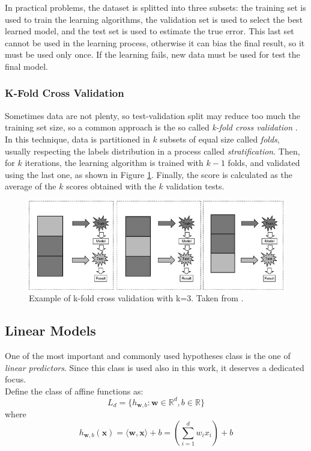 In practical problems, the dataset is splitted into three subsets: the training set is used to train the learning algorithms, the validation set is used to select the best learned model, and the test set is used to estimate the true error. This last set cannot be used in the learning process, otherwise it can bias the final result, so it must be used only once. If the learning fails, new data must be used for test the final model.


\subsubsection{K-Fold Cross Validation}
Sometimes data are not plenty, so test-validation split may reduce too much the training set size, so a common approach is the so called \textit{k-fold cross validation} \cite{Refaeilzadeh2009}. In this technique, data is partitioned in $k$ subsets of equal size called \textit{folds}, usually respecting the labels distribution in a process called \textit{stratification}. Then, for $k$ iterations, the learning algorithm is trained with $k-1$ folds, and validated using the last one, as shown in Figure \ref{fig:kfold}. Finally, the score is calculated as the average of the $k$ scores obtained with the $k$ validation tests. 

\begin{figure}[ht]
	\centering
	\includegraphics[width=1\textwidth]{figures/kfold.jpg}
	\caption{Example of k-fold cross validation with k=3. Taken from \cite{Refaeilzadeh2009}.}
	\label{fig:kfold}
\end{figure}


\subsection{Linear Models}
One of the most important and commonly used hypotheses class is the one of \textit{linear predictors}. Since this class is used also in this work, it deserves a dedicated focus.\\
Define the class of affine functions as:
\[ L_d = \{h_{\textbf{w},b} : \mathbf{w} \in \mathbb{R}^d, b \in \mathbb{R} \} \]
where
\[ h_{\mathbf{w}, b}(\mathbf{x}) = \langle \mathbf{w},\mathbf{x} \rangle + b = \left( \sum_{i=1}^{d} w_i x_i \right) + b \]

